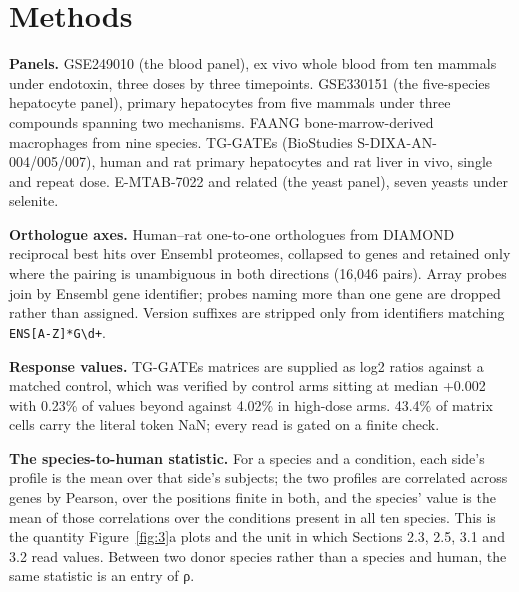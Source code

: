 \documentclass[11pt,a4paper]{article}
\begin{document}
\section{Methods}\label{methods}

\textbf{Panels.} GSE249010 \cite{ref33} (the blood panel), ex vivo whole
blood from ten mammals under endotoxin, three doses by three timepoints.
GSE330151 (the five-species hepatocyte panel), primary hepatocytes from
five mammals under three compounds spanning two mechanisms. FAANG
bone-marrow-derived macrophages from nine species. TG-GATEs \cite{ref34}
(BioStudies S-DIXA-AN-004/005/007), human and rat primary hepatocytes
and rat liver in vivo, single and repeat dose. E-MTAB-7022 and related
(the yeast panel), seven yeasts under selenite.

\textbf{Orthologue axes.} Human--rat one-to-one orthologues from DIAMOND
\cite{ref35} reciprocal best hits over Ensembl proteomes, collapsed to genes
and retained only where the pairing is unambiguous in both directions
(16,046 pairs). Array probes join by Ensembl gene identifier; probes
naming more than one gene are dropped rather than assigned. Version
suffixes are stripped only from identifiers matching
\texttt{ENS{[}A-Z{]}*G\textbackslash{}d+}.

\textbf{Response values.} TG-GATEs matrices are supplied as log2 ratios
against a matched control, which was verified by control arms sitting at
median +0.002 with 0.23\% of values beyond \textbar{} against
4.02\% in high-dose arms. 43.4\% of matrix cells carry the literal token
NaN; every read is gated on a finite check.

\textbf{The species-to-human statistic.} For a species and a condition,
each side's profile is the mean over that side's subjects; the two
profiles are correlated across genes by Pearson, over the positions
finite in both, and the species' value is the mean of those correlations
over the conditions present in all ten species. This is the quantity
Figure~\ref{fig:3}a plots and the unit in which Sections 2.3, 2.5, 3.1 and 3.2
read values. Between two donor species rather than a species and human,
the same statistic is an entry of ρ.
\end{document}
